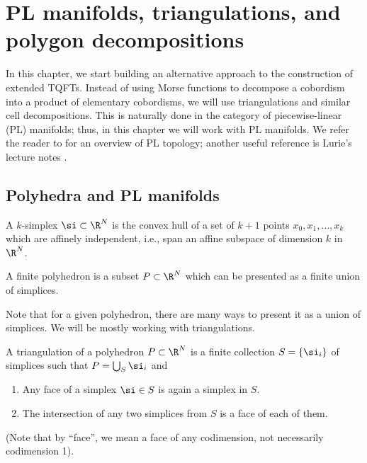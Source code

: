 \chapter{PL manifolds, triangulations, and polygon decompositions}\label{c:PL}

In this chapter, we start building an alternative approach to the construction
of extended TQFTs. Instead of using Morse functions to decompose a cobordism
into a product of elementary cobordisms, we will use triangulations and similar
cell decompositions. This is naturally done in the category of piecewise-linear
(PL) manifolds; thus, in this chapter we will work with PL manifolds. We refer
the reader to \cite{rourke} for an overview of PL topology; another useful
reference is Lurie's lecture notes \cite{lurie-PL}.

\section{Polyhedra and PL manifolds}\label{s:polyhedra-pl}
\begin{definition}
  A $k$-simplex $\si\subset \R^N$ is the convex hull of a set of $k+1$ points
  $x_0, x_1, \dots, x_k$ which are affinely independent, i.e., span an affine
  subspace of dimension $k$ in $\R^N$.

  A finite polyhedron is a subset $P\subset \R^N$ which can be presented as a
  finite union of simplices.
\end{definition}
Note that for a given polyhedron, there are many ways to present it as a union
of simplices. We will be mostly working with triangulations.

\begin{definition}\label{d:triangulation}
  A triangulation of a polyhedron $P\subset \R^N$ is a finite
  collection $S=\{\si_i\}$ of simplices such that $P=\bigcup_S \si_i$
  and
  \begin{enumerate}
    \item Any face of a simplex $\si\in S$ is again a simplex in $S$.
    \item The intersection of any two simplices from $S$ is a face of each of them.
  \end{enumerate}
\end{definition}
(Note that by ``face'', we mean a face of any codimension, not necessarily
 codimension 1).

